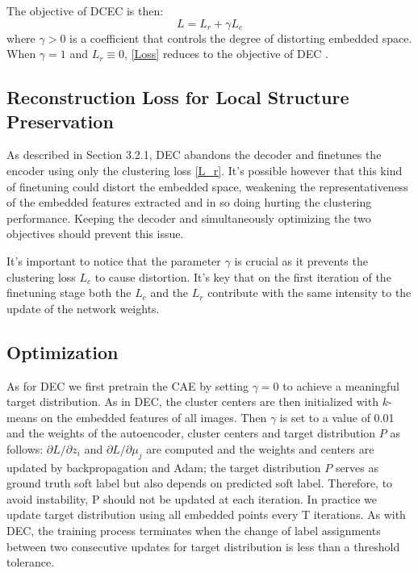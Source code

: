 The objective of DCEC is then:
\begin{equation}
    L = L_r + \gamma L_c
    \label{Loss}
\end{equation}
where $\gamma > 0$ is a coefficient that controls the degree of distorting embedded space. When $\gamma = 1$ and $L_r \equiv 0$, \ref{Loss} reduces to the objective of DEC \cite{xie2016unsupervised}.

\subsection{Reconstruction Loss for Local Structure Preservation}

As described in Section 3.2.1, DEC \cite{xie2016unsupervised} abandons the decoder and finetunes the encoder using only the clustering loss \ref{L_r}. It's possible however that this kind of finetuning could distort the embedded space, weakening the representativeness of the embedded features extracted and in so doing hurting the clustering performance. Keeping the decoder and simultaneously optimizing the two objectives should prevent this issue.

It's important to notice that the parameter $\gamma$ is crucial as it prevents the clustering loss $L_c$ to cause distortion. It's key that on the first iteration of the finetuning stage both the $L_c$ and the $L_r$ contribute with the same intensity to the update of the network weights.

\subsection{Optimization}

As for DEC we first pretrain the CAE by setting $\gamma = 0$ to achieve a meaningful target distribution. As in DEC, the cluster centers are then initialized with $k$-means on the embedded features of all images. Then $\gamma$ is set to a value of 0.01 and the weights of the autoencoder, cluster centers and target distribution $P$ as follows: $\partial L / \partial z_i$ and $\partial L / \partial \mu_j$ are computed and the weights and centers are updated by backpropagation and Adam; the target distribution $P$ serves as ground truth soft label but also depends on predicted soft label. Therefore, to avoid instability, P should not be updated at each iteration. In practice we update target distribution using all embedded points every T iterations. As with DEC, the training process terminates when the change of label assignments between two consecutive updates for target distribution is less than a threshold tolerance.

